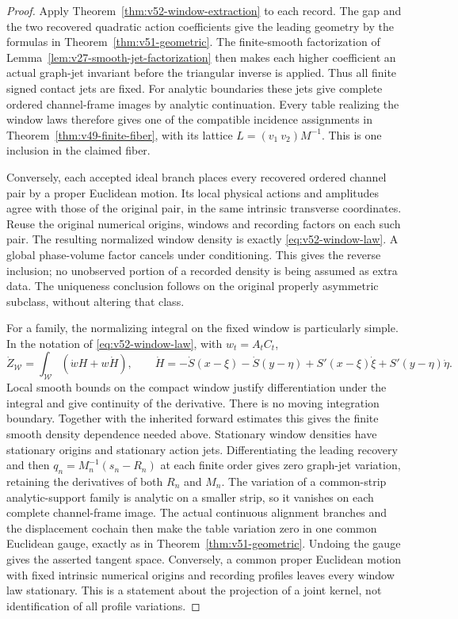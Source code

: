 \begin{proof}
Apply Theorem~\ref{thm:v52-window-extraction} to each record.  The gap
and the two recovered quadratic action coefficients give the leading
geometry by the formulas in Theorem~\ref{thm:v51-geometric}.  The
finite-smooth factorization of Lemma~\ref{lem:v27-smooth-jet-factorization}
then makes each higher coefficient an actual graph-jet invariant before
the triangular inverse is applied.  Thus all finite signed contact jets
are fixed.  For analytic boundaries these jets give complete ordered
channel-frame images by analytic continuation.  Every table realizing
the window laws therefore gives one of the compatible incidence
assignments in Theorem~\ref{thm:v49-finite-fiber}, with its lattice
$L=(v_1\ v_2)M^{-1}$.  This is one inclusion in the claimed fiber.

Conversely, each accepted ideal branch places every recovered ordered
channel pair by a proper Euclidean motion.  Its local physical actions
and amplitudes agree with those of the original pair, in the same
intrinsic transverse coordinates.  Reuse the original numerical origins,
windows and recording factors on each such pair.  The resulting
normalized window density is exactly \eqref{eq:v52-window-law}.
A global phase-volume factor cancels under conditioning.  This gives
the reverse inclusion; no unobserved portion of a recorded density is
being assumed as extra data.  The uniqueness conclusion follows on
the original properly asymmetric subclass, without altering that class.

For a family, the normalizing integral on the fixed window is
particularly simple.  In the notation of \eqref{eq:v52-window-law},
with $w_t=A_tC_t$,
\[
 \dot Z_{\mathcal W}
       =\int_{\mathcal W}(\dot w H+w\dot H),\qquad
 \dot H=-\dot S(x-\xi)-\dot S(y-\eta)
           +S'(x-\xi)\dot\xi+S'(y-\eta)\dot\eta.
\]
Local smooth bounds on the compact window justify differentiation under
the integral and give continuity of the derivative.  There is no moving
integration boundary.  Together with the inherited forward estimates
this gives the finite smooth density dependence needed above.
Stationary window densities have stationary origins and stationary
action jets.  Differentiating the leading recovery and then
$q_n=M_n^{-1}(s_n-R_n)$ at each finite order gives zero graph-jet
variation, retaining the derivatives of both $R_n$ and $M_n$.
The variation of a common-strip analytic-support family is analytic on
a smaller strip, so it vanishes on each complete channel-frame image.
The actual continuous alignment branches and the displacement cochain
then make the table variation zero in one common Euclidean gauge,
exactly as in Theorem~\ref{thm:v51-geometric}.  Undoing the gauge gives
the asserted tangent space.  Conversely, a common proper Euclidean
motion with fixed intrinsic numerical origins and recording profiles
leaves every window law stationary.  This is a statement about the
projection of a joint kernel, not identification of all profile
variations.
\end{proof}


